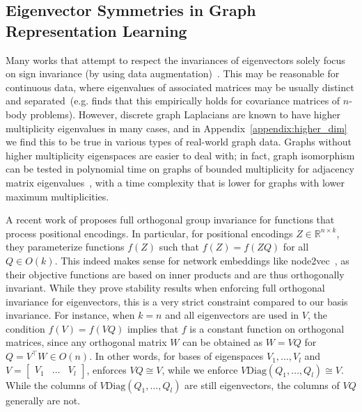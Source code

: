 \documentclass{article} \usepackage{iclr2023_conference,times}
\newcommand{\RR}{\mathbb R}
\newcommand{\mrm}[1]{\mathrm{#1}}
\begin{document}
\subsection{Eigenvector Symmetries in Graph Representation Learning}\label{appendix:more_related_eigvec}

Many works that attempt to respect the invariances of eigenvectors solely focus on sign invariance (by using data augmentation)~\citep{dwivedi2020benchmarking, dwivedi2020generalization, dwivedi2022graph, kreuzer2021rethinking}. This may be reasonable for continuous data, where eigenvalues of associated matrices may be usually distinct and separated~(e.g. \cite{puny2021frame} finds that this empirically holds for covariance matrices of $n$-body problems). However, discrete graph Laplacians are known to have higher multiplicity eigenvalues in many cases, and in Appendix~\ref{appendix:higher_dim} we find this to be true in various types of real-world graph data. Graphs without higher multiplicity eigenspaces are easier to deal with; in fact, graph isomorphism can be tested in polynomial time on graphs of bounded multiplicity for adjacency matrix eigenvalues~\citep{babai1982isomorphism, LeightonMiller79}, with a time complexity that is lower for graphs with lower maximum multiplicities.

A recent work of \citet{wang2022equivariant} proposes full orthogonal group invariance for functions that process positional encodings. In particular, for positional encodings $Z \in \RR^{n \times k}$, they parameterize functions $f(Z)$ such that $f(Z) = f(ZQ)$ for all $Q \in O(k)$. This indeed makes sense for network embeddings like node2vec~\citep{grover2016node2vec}, as their objective functions are based on inner products and are thus orthogonally invariant. While they prove stability results when enforcing full orthogonal invariance for eigenvectors, this is a very strict constraint compared to our basis invariance. For instance, when $k=n$ and all eigenvectors are used in $V$, the condition $f(V) = f(VQ)$ implies that $f$ is a constant function on orthogonal matrices, since any orthogonal matrix $W$ can be obtained as $W = VQ$ for $Q = V^\top W \in O(n)$.
In other words, for bases of eigenspaces $V_1, \ldots, V_l$ and $V = \begin{bmatrix} V_1 & \ldots & V_l \end{bmatrix}$, \citet{wang2022equivariant} enforces $VQ \cong V$, while we enforce $V \mrm{Diag}(Q_1, \ldots, Q_l) \cong V$. While the columns of $V \mrm{Diag}(Q_1, \ldots, Q_l)$ are still eigenvectors, the columns of $VQ$ generally are not.
\end{document}
